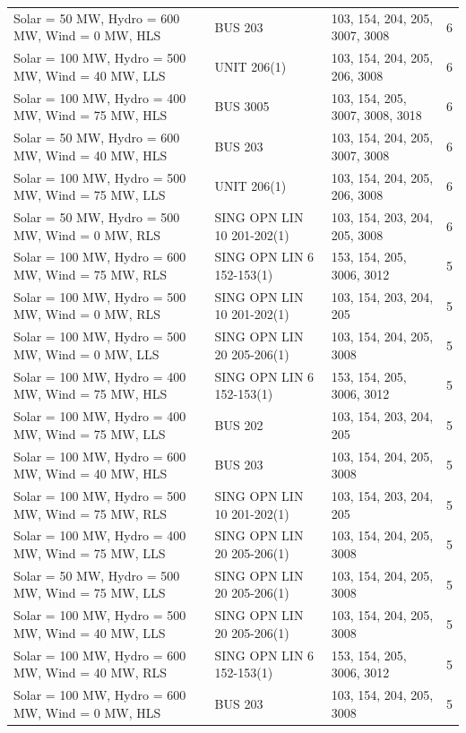 \documentclass[10pt]{report}
\begin{document}
\begin{table}[H]
{\begin{tabular}{llp{8cm}r}
Solar = 50 MW, Hydro = 600 MW, Wind = 0 MW, HLS & BUS 203 & 103, 154, 204, 205, 3007, 3008 & 6 \\
Solar = 100 MW, Hydro = 500 MW, Wind = 40 MW, LLS & UNIT 206(1) & 103, 154, 204, 205, 206, 3008 & 6 \\
Solar = 100 MW, Hydro = 400 MW, Wind = 75 MW, HLS & BUS 3005 & 103, 154, 205, 3007, 3008, 3018 & 6 \\
Solar = 50 MW, Hydro = 600 MW, Wind = 40 MW, HLS & BUS 203 & 103, 154, 204, 205, 3007, 3008 & 6 \\
Solar = 100 MW, Hydro = 500 MW, Wind = 75 MW, LLS & UNIT 206(1) & 103, 154, 204, 205, 206, 3008 & 6 \\
Solar = 50 MW, Hydro = 500 MW, Wind = 0 MW, RLS & SING OPN LIN   10 201-202(1) & 103, 154, 203, 204, 205, 3008 & 6 \\
Solar = 100 MW, Hydro = 600 MW, Wind = 75 MW, RLS & SING OPN LIN   6 152-153(1) & 153, 154, 205, 3006, 3012 & 5 \\
Solar = 100 MW, Hydro = 500 MW, Wind = 0 MW, RLS & SING OPN LIN   10 201-202(1) & 103, 154, 203, 204, 205 & 5 \\
Solar = 100 MW, Hydro = 500 MW, Wind = 0 MW, LLS & SING OPN LIN   20 205-206(1) & 103, 154, 204, 205, 3008 & 5 \\
Solar = 100 MW, Hydro = 400 MW, Wind = 75 MW, HLS & SING OPN LIN   6 152-153(1) & 153, 154, 205, 3006, 3012 & 5 \\
Solar = 100 MW, Hydro = 400 MW, Wind = 75 MW, LLS & BUS 202 & 103, 154, 203, 204, 205 & 5 \\
Solar = 100 MW, Hydro = 600 MW, Wind = 40 MW, HLS & BUS 203 & 103, 154, 204, 205, 3008 & 5 \\
Solar = 100 MW, Hydro = 500 MW, Wind = 75 MW, RLS & SING OPN LIN   10 201-202(1) & 103, 154, 203, 204, 205 & 5 \\
Solar = 100 MW, Hydro = 400 MW, Wind = 75 MW, LLS & SING OPN LIN   20 205-206(1) & 103, 154, 204, 205, 3008 & 5 \\
Solar = 50 MW, Hydro = 500 MW, Wind = 75 MW, LLS & SING OPN LIN   20 205-206(1) & 103, 154, 204, 205, 3008 & 5 \\
Solar = 100 MW, Hydro = 500 MW, Wind = 40 MW, LLS & SING OPN LIN   20 205-206(1) & 103, 154, 204, 205, 3008 & 5 \\
Solar = 100 MW, Hydro = 600 MW, Wind = 40 MW, RLS & SING OPN LIN   6 152-153(1) & 153, 154, 205, 3006, 3012 & 5 \\
Solar = 100 MW, Hydro = 600 MW, Wind = 0 MW, HLS & BUS 203 & 103, 154, 204, 205, 3008 & 5 \\

\end{tabular}}
\end{table}
\end{document}
